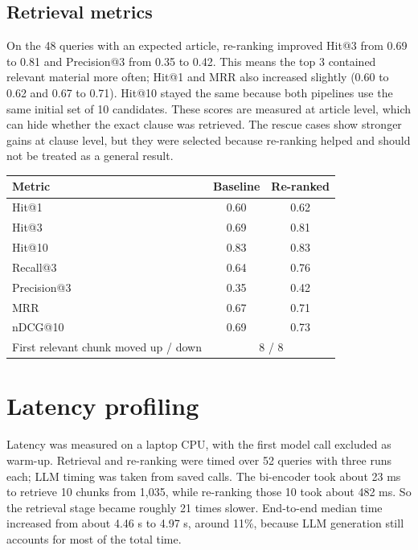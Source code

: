 \documentclass[11pt,a4paper]{article}
\begin{document}
\subsection{Retrieval metrics}
On the 48 queries with an expected article, re-ranking improved Hit@3 from 0.69 to 0.81 and Precision@3 from 0.35 to 0.42. This means the top 3 contained relevant material more often; Hit@1 and MRR also increased slightly (0.60 to 0.62 and 0.67 to 0.71). Hit@10 stayed the same because both pipelines use the same initial set of 10 candidates. These scores are measured at article level, which can hide whether the exact clause was retrieved. The rescue cases show stronger gains at clause level, but they were selected because re-ranking helped and should not be treated as a general result.

\par\medskip\noindent\begin{minipage}{\linewidth}\centering\small
{}\label{tab:metrics}
\begin{tabular}{@{}lcc@{}}\toprule
Metric & Baseline & Re-ranked\\\midrule
Hit@1 & 0.60 & 0.62\\
Hit@3 & 0.69 & 0.81\\
Hit@10 & 0.83 & 0.83\\
Recall@3 & 0.64 & 0.76\\
Precision@3 & 0.35 & 0.42\\
MRR & 0.67 & 0.71\\
nDCG@10 & 0.69 & 0.73\\\midrule
First relevant chunk moved up / down & \multicolumn{2}{c}{8 / 8}\\\bottomrule
\end{tabular}
\end{minipage}\par\medskip

\section{Latency profiling}
Latency was measured on a laptop CPU, with the first model call excluded as warm-up. Retrieval and re-ranking were timed over 52 queries with three runs each; LLM timing was taken from saved calls. The bi-encoder took about 23 ms to retrieve 10 chunks from 1,035, while re-ranking those 10 took about 482 ms. So the retrieval stage became roughly 21 times slower. End-to-end median time increased from about 4.46 s to 4.97 s, around 11\%, because LLM generation still accounts for most of the total time.
\end{document}
